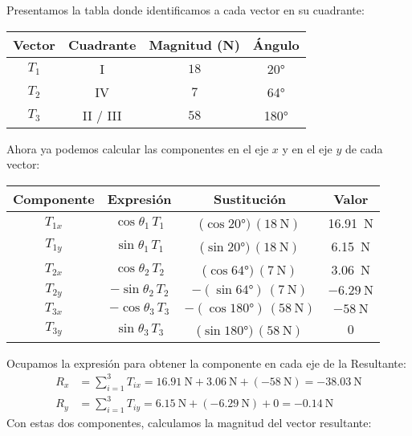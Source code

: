 \documentclass[14pt]{extarticle}
\begin{document}
Presentamos la tabla donde identificamos a cada vector en su cuadrante:
\begin{table}[H]
    \centering
    \begin{tabular}{c | c | c | c}
        Vector & Cuadrante & Magnitud (\unit{\newton}) & Ángulo \\ \hline
        $T_{1}$ & I & $18$ & \ang{20} \\ \hline
        $T_{2}$ & IV & $7$ & \ang{64} \\ \hline
        $T_{3}$ & II / III & $58$ & \ang{180} \\ \hline        
    \end{tabular}
\end{table}
Ahora ya podemos calcular las componentes en el eje $x$ y en el eje $y$ de cada vector:
\begin{table}[H]
    \centering
    \begin{tabular}{c | c | c | c}
        Componente & Expresión & Sustitución & Valor \\ \hline
        $T_{1x}$ & $\cos \theta_{1} \, T_{1}$ & ($\cos \ang{20}) \, (\SI{18}{\newton})$ & \SI{16.91}{\newton} \\ \hline
        $T_{1y}$ & $\sin \theta_{1} \, T_{1}$ & ($\sin \ang{20}) \, (\SI{18}{\newton})$ & \SI{6.15}{\newton} \\ \hline
        $T_{2x}$ & $\cos \theta_{2} \, T_{2}$ & ($\cos \ang{64}) \, (\SI{7}{\newton})$ & \SI{3.06}{\newton} \\ \hline
        $T_{2y}$ & $-\sin \theta_{2} \, T_{2}$ & $-(\sin \ang{64}) \, (\SI{7}{\newton})$ & $-\SI{6.29}{\newton}$ \\ \hline        
        $T_{3x}$ & $-\cos \theta_{3} \, T_{3}$ & $-(\cos \ang{180}) \, (\SI{58}{\newton})$ & $-\SI{58}{\newton}$ \\ \hline
        $T_{3y}$ & $\sin \theta_{3} \, T_{3}$ & ($\sin \ang{180}) \, (\SI{58}{\newton})$ & $0$ \\ \hline        
    \end{tabular}
\end{table}
Ocupamos la expresión para obtener la componente en cada eje de la Resultante:
\begin{align*}
R_{x} &= \sum_{i=1}^{3} T_{ix} = \SI{16.91}{\newton} + \SI{3.06}{\newton} + (-\SI{58}{\newton}) = -\SI{38.03}{\newton} \\[0.75em]
R_{y} &= \sum_{i=1}^{3} T_{iy} = \SI{6.15}{\newton} + (-\SI{6.29}{\newton}) + 0 = -\SI{0.14}{\newton}
\end{align*}
Con estas dos componentes, calculamos la magnitud del vector resultante:
\end{document}
